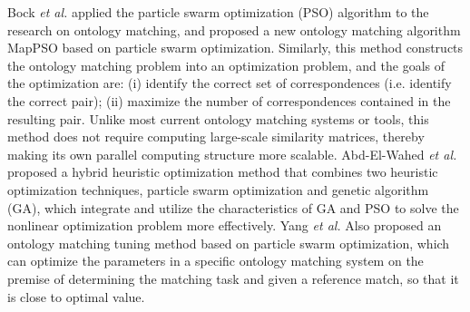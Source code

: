 \documentclass[twoside]{article}
\begin{document}
Bock {\it et al.} applied the particle swarm optimization (PSO) algorithm to the research on ontology matching, and proposed a new ontology matching algorithm MapPSO based on particle swarm optimization\cite{wwy46}.
Similarly, this method constructs the ontology matching problem into an optimization problem, and the goals of the optimization are: (i) identify the correct set of correspondences (i.e. identify the correct pair); (ii) maximize the number of correspondences contained in the resulting pair. Unlike most current ontology matching systems or tools, this method does not require computing large-scale similarity matrices, thereby making its own parallel computing structure more scalable.
Abd-El-Wahed {\it et al.} proposed a hybrid heuristic optimization method that combines two heuristic optimization techniques, particle swarm optimization and genetic algorithm (GA)\cite{wwy47}, which integrate and utilize the characteristics of GA and PSO to solve the nonlinear optimization problem more effectively.
Yang {\it et al.} Also proposed an ontology matching tuning method based on particle swarm optimization\cite{wwy48}, which can optimize the parameters in a specific ontology matching system on the premise of determining the matching task and given a reference match, so that it is close to optimal value.
\end{document}
